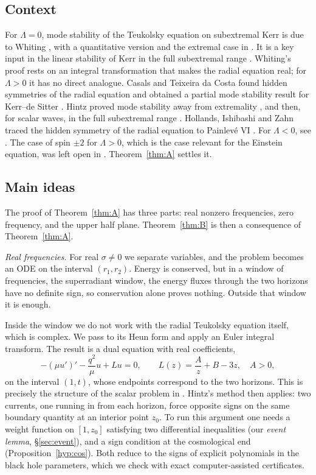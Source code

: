 \documentclass[11pt]{amsart}
\theoremstyle{definition}
\theoremstyle{remark}
\numberwithin{equation}{section}
\begin{document}
\subsection{Context}
For $\Lambda=0$, mode stability of the Teukolsky equation on subextremal Kerr is due to Whiting \cite{Whi89}, with a
quantitative version and the extremal case in \cite{SR15,TdC20}. It is a key input in the linear stability of Kerr in
the full subextremal range \cite{HHV25}. Whiting's proof rests on an integral transformation that makes the radial
equation real; for $\Lambda>0$ it has no direct analogue. Casals and Teixeira da Costa found hidden symmetries of the
radial equation and obtained a partial mode stability result for Kerr--de Sitter \cite{CTdC22}. Hintz proved mode
stability away from extremality \cite{Hin25}, and then, for scalar waves, in the full subextremal range \cite{Hin26}.
Hollands, Ishibashi and Zahn traced the hidden symmetry of the radial equation to Painlev\'e VI \cite{HIZ26}. For
$\Lambda<0$, see \cite{GH23}. The case of spin $\pm2$ for $\Lambda>0$, which is the case relevant for the Einstein
equation, was left open in \cite{Hin26}. Theorem~\ref{thm:A} settles it.

\subsection{Main ideas}
The proof of Theorem~\ref{thm:A} has three parts: real nonzero frequencies, zero frequency, and the upper half plane.
Theorem~\ref{thm:B} is then a consequence of Theorem~\ref{thm:A}.

\emph{Real frequencies.} For real $\sigma\ne0$ we separate variables, and the problem becomes an ODE on the interval
$(r_1,r_2)$. Energy is conserved, but in a window of frequencies, the superradiant window, the energy fluxes through
the two horizons have no definite sign, so conservation alone proves nothing. Outside that window it is enough.

Inside the window we do not work with the radial Teukolsky equation itself, which is complex. We pass to its Heun
form and apply an Euler integral transform. The result is a dual equation with real coefficients,
\[
-(\mu u')'-\frac{q^2}{\mu}u+Lu=0,\qquad L(z)=\frac{A}{z}+B-3z,\quad A>0,
\]
on the interval $(1,t)$, whose endpoints correspond to the two horizons. This is precisely the structure of the scalar
problem in \cite{Hin26}. Hintz's method then applies: two currents, one running in from each horizon, force opposite
signs on the same boundary quantity at an interior point $z_0$. To run this argument one needs a weight function on
$[1,z_0]$ satisfying two differential inequalities (our \emph{event lemma}, \S\ref{sec:event}), and a sign condition
at the cosmological end (Proposition~\ref{hyp:cos}). Both reduce to the signs of explicit polynomials in the black hole
parameters, which we check with exact computer-assisted certificates.
\end{document}
